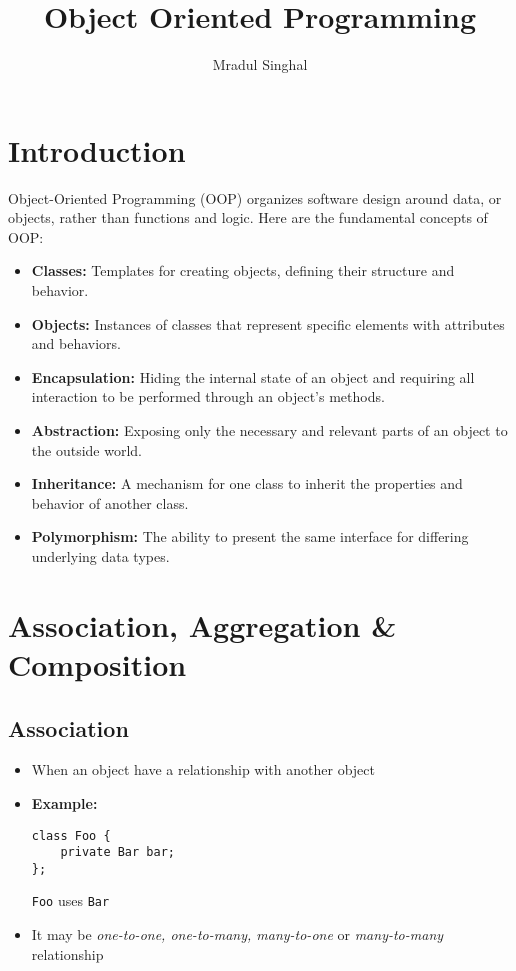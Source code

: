 \documentclass[12pt]{article}
\title{Object Oriented Programming}
\author{Mradul Singhal}
\begin{document}
\maketitle
\newpage

\tableofcontents
\newpage

\section{Introduction}
Object-Oriented Programming (OOP) organizes software design around data, or objects, rather than functions and logic. Here are the fundamental concepts of OOP:
\begin{itemize}
    \item \textbf{Classes:} Templates for creating objects, defining their structure and behavior.
    \item \textbf{Objects:} Instances of classes that represent specific elements with attributes and behaviors.
    \item \textbf{Encapsulation:} Hiding the internal state of an object and requiring all interaction to be performed through an object's methods.
    \item \textbf{Abstraction:} Exposing only the necessary and relevant parts of an object to the outside world.
    \item \textbf{Inheritance:} A mechanism for one class to inherit the properties and behavior of another class.
    \item \textbf{Polymorphism:} The ability to present the same interface for differing underlying data types.
\end{itemize}
\newpage

\section{Association, Aggregation \& Composition}
\subsection{Association}
\begin{itemize}
    \item When an object have a relationship with another object
    \item \textbf{Example:}
          \begin{lstlisting}
class Foo {
    private Bar bar;
};
          \end{lstlisting}
          \lstinline|Foo| uses \lstinline|Bar|
    \item It may be \textit{one-to-one, one-to-many, many-to-one} or \textit{many-to-many} relationship
\end{itemize}
\end{document}
